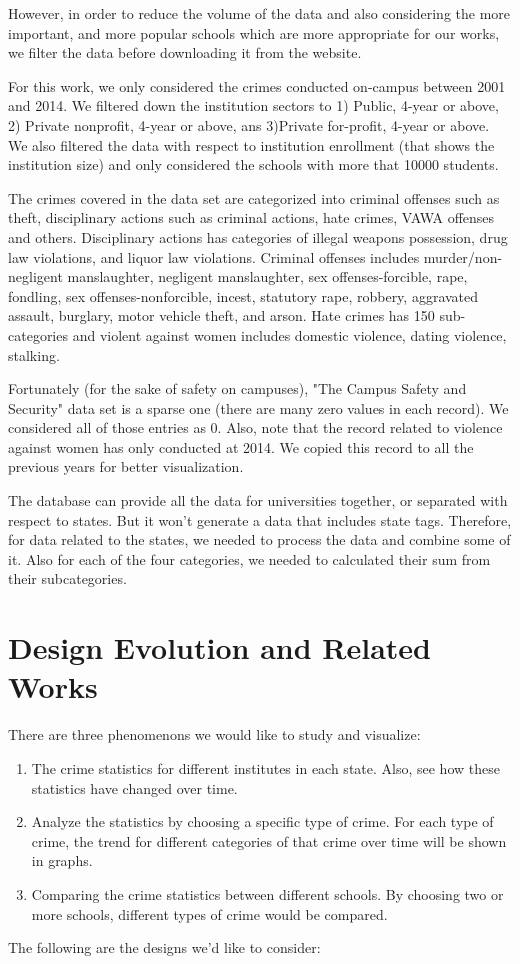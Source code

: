 \documentclass[12pt]{article}
\begin{document}
However, in order to reduce the volume of the data and also considering the more important, and more popular schools which are more appropriate for our works, we filter the data before downloading it from the website. 

For this work, we only considered the crimes conducted on-campus between 2001 and 2014. We filtered down the institution sectors to 1) Public, 4-year or above, 2) Private nonprofit, 4-year or above, ans 3)Private for-profit, 4-year or above. We also filtered the data with respect to institution enrollment (that shows the institution size) and only considered the schools with more that 10000 students.

The crimes covered in the data set are categorized into criminal offenses such as theft, disciplinary actions such as criminal actions, hate crimes, VAWA offenses and others. Disciplinary actions has categories of illegal weapons possession, drug law violations, and liquor law violations. Criminal offenses includes murder/non-negligent manslaughter, negligent manslaughter, sex offenses-forcible, rape, fondling, sex offenses-nonforcible, incest, statutory rape, robbery, aggravated assault, burglary, motor vehicle theft, and arson. Hate crimes has 150 sub-categories and violent against women includes domestic violence, dating violence, stalking.

Fortunately (for the sake of safety on campuses), "The Campus Safety and Security" data set is a sparse one (there are many zero values in each record). We considered all of those entries as 0. Also, note that the record related to violence against women has only conducted at 2014. We copied this record to all the previous years for better visualization.

The database can provide all the data for universities together, or separated with respect to states. But it won't generate a data that includes state tags. Therefore, for data related to the states, we needed to process the data and combine some of it. Also for each of the four categories, we needed to calculated their sum from their subcategories.

\section{Design Evolution and Related Works}

There are three phenomenons we would like to study and visualize:
\begin{enumerate}
\item The crime statistics for different institutes in each state. Also, see how these statistics have changed over time.
\item Analyze the statistics by choosing a specific type of crime. For each type of crime, the trend for different categories of that crime over time will be shown in graphs.
\item Comparing the crime statistics between different schools. By choosing two or more schools, different types of crime would be compared.
\end{enumerate}
The following are the designs we'd like to consider:\\
\end{document}
